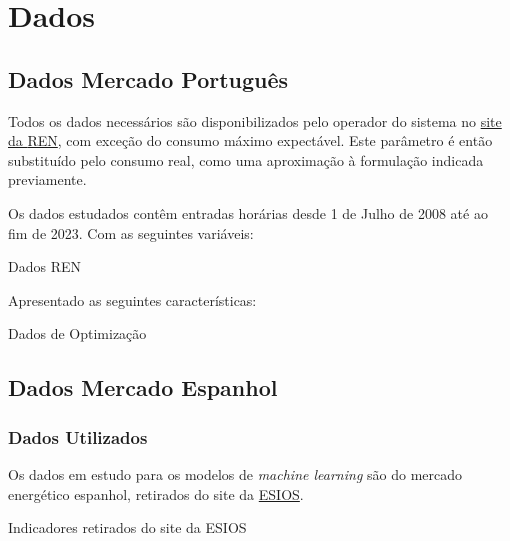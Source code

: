 \newpage
\section{Dados}

\subsection{Dados Mercado Português\label{se:dados_pt}}

Todos os dados necessários são disponibilizados pelo operador do sistema no \href{https://mercado.ren.pt/PT/Electr}{site da \gls{REN}}, com exceção do consumo máximo expectável. Este parâmetro é então substituído pelo consumo real, como uma aproximação à formulação indicada previamente.\par
Os dados estudados contêm entradas horárias desde 1 de Julho de 2008 até ao fim de 2023. Com as seguintes variáveis:\\

\begin{table}[H] \centering \caption{Dados REN}  \end{table}

Apresentado as seguintes características:\par
\begin{table}[H]
    \centering
    \caption{Dados de Optimização}    
    \resizebox{0.7\linewidth}{!}{}
    \end{table}


\subsection{Dados Mercado Espanhol\label{se:dados_es}}


\subsubsection{Dados Utilizados\label{se:dadosestudo}}

Os dados em estudo para os modelos de \textit{machine learning} são do mercado energético espanhol, retirados do site da \href{https://www.esios.ree.es/es}{\gls{ESIOS}}.


\begin{table}[H]
    \centering
    \caption{Indicadores retirados do site da ESIOS}    
\end{table}


